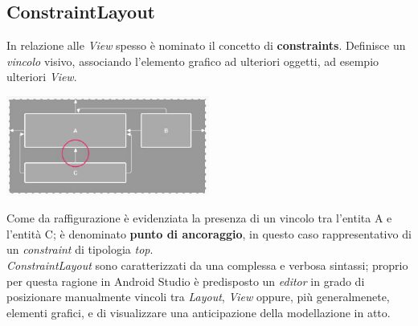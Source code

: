 \documentclass{article}
\begin{document}
\subsection*{ConstraintLayout}
In relazione alle \textit{View} spesso è nominato il concetto di \textbf{constraints}. Definisce un \textit{vincolo} visivo, associando l'elemento grafico ad ulteriori oggetti, ad esempio ulteriori \textit{View}. 
\begin{center}
  \includegraphics[width=0.5\textwidth]{foto1.png}
\end{center}
Come da raffigurazione è evidenziata la presenza di un vincolo tra l'entita A e l'entità C; è denominato \textbf{punto di ancoraggio}, in questo caso rappresentativo di un \textit{constraint} di tipologia \textit{top}.\vspace*{14pt}\\ 
\textit{ConstraintLayout} sono caratterizzati da una complessa e verbosa sintassi; proprio per questa ragione in Android Studio è predisposto un \textit{editor} in grado di posizionare manualmente vincoli tra \textit{Layout}, \textit{View} oppure, più generalmenete, elementi grafici, e di visualizzare una anticipazione della modellazione in atto.
\end{document}
